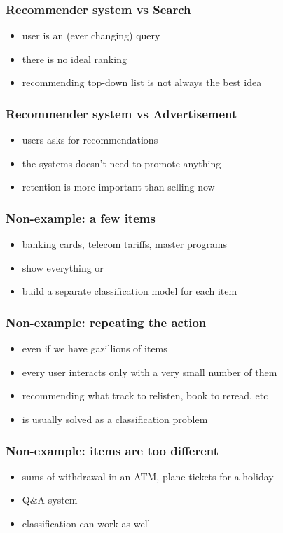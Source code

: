 \documentclass[t]{beamer}
\begin{document}
\begin{frame}
  \frametitle{Recommender system vs Search}
  \begin{itemize}
  \item user is an (ever changing) query
  \item there is no ideal ranking
  \item recommending top-down list is not always the best idea
  \end{itemize}
\end{frame}
\begin{frame}
  \frametitle{Recommender system vs Advertisement}
  \begin{itemize}
  \item users asks for recommendations
  \item the systems doesn’t need to promote anything
  \item retention is more important than selling now
  \end{itemize}
\end{frame}
\begin{frame}
  \frametitle{Non-example: a few items}
  \begin{itemize}
  \item banking cards, telecom tariffs, master programs
  \item show everything or
  \item build a separate classification model for each item
  \end{itemize}
\end{frame}
\begin{frame}
  \frametitle{Non-example: repeating the action}
  \begin{itemize}
  \item even if we have gazillions of items
  \item every user interacts only with a very small number of them
  \item recommending what track to relisten, book to reread, etc
  \item is usually solved as a classification problem
  \end{itemize}
\end{frame}
\begin{frame}
  \frametitle{Non-example: items are too different}
  \begin{itemize}
  \item sums of withdrawal in an ATM, plane tickets for a holiday
  \item Q\&A system
  \item classification can work as well
  \end{itemize}
\end{frame}
\end{document}
